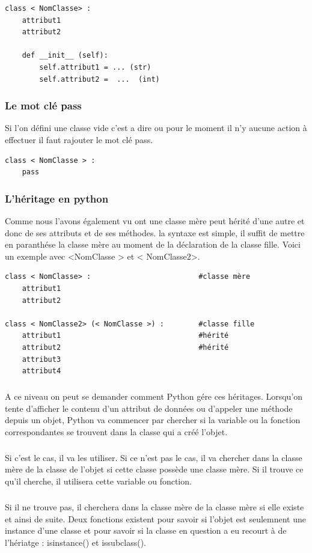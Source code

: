 \documentclass[a4paper, 12pt, twoside]{article}
\begin{document}
\begin{verbatim}
class < NomClasse> : 
    attribut1
    attribut2 

    def __init__ (self):
        self.attribut1 = ... (str)
        self.attribut2 =  ...  (int)
\end{verbatim}

\subsubsection{Le mot clé pass}{Si l'on défini une classe vide c'est a dire ou pour le moment il n'y aucune action à effectuer il faut rajouter le mot clé \textsf{pass}.}
\begin{verbatim}
class < NomClasse > : 
    pass 
\end{verbatim}
\subsubsection{L'héritage en python}{Comme nous l'avons également vu ont une classe mère peut hérité d'une autre et donc de ses attributs et de ses méthodes. la syntaxe est simple, il suffit de mettre en paranthése la classe mère au moment de la déclaration de la classe fille. Voici un exemple avec <NomClasse > et < NomClasse2>.}
\begin{verbatim}
class < NomClasse> :                         #classe mère
    attribut1
    attribut2 

class < NomClasse2> (< NomClasse >) :        #classe fille
    attribut1                                #hérité 
    attribut2                                #hérité 
    attribut3   
    attribut4
\end{verbatim}
\subparagraph{}{A ce niveau on peut se demander comment Python gére ces héritages. Lorsqu’on tente d’afficher le contenu d’un attribut de données ou d’appeler une méthode depuis un objet, Python va commencer par chercher si la variable ou la fonction correspondantes se trouvent dans la classe qui a créé l’objet.}

\subparagraph{}{Si c’est le cas, il va les utiliser. Si ce n’est pas le cas, il va chercher dans la classe mère de la classe de l’objet si cette classe possède une classe mère. Si il trouve ce qu’il cherche, il utilisera cette variable ou fonction.}

\subparagraph{}{Si il ne trouve pas, il cherchera dans la classe mère de la classe mère si elle existe et ainsi de suite. Deux fonctions existent pour savoir si l'objet est seulemnent  une instance d'une classe et pour savoir si la classe en question a eu recourt à de l'hériatge : isinstance() et issubclass(). }
\end{document}
